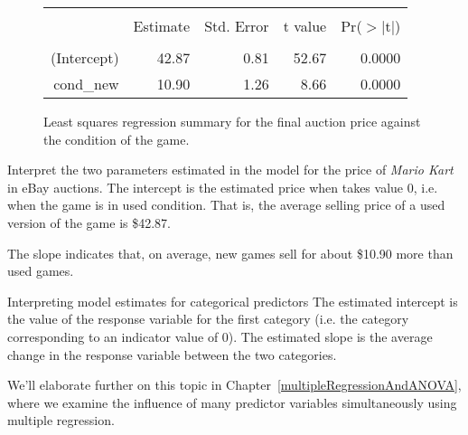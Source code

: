 \begin{figure}
\centering
\begin{tabular}{rrrrr}
  \hline
  \vspace{-3.7mm} & & & & \\
 & Estimate & Std. Error & t value & Pr($>$$|$t$|$) \\ 
  \hline
  \vspace{-3.6mm} & & & & \\
(Intercept) & 42.87 & 0.81 & 52.67 & 0.0000 \\ 
  cond\_\hspace{0.3mm}new & 10.90 & 1.26 & 8.66 & 0.0000 \\ 
   \hline
\end{tabular}
\caption{Least squares regression summary for the final auction price against the condition of the game.}
\label{marioKartNewUsedRegrSummary}
\end{figure}

\begin{examplewrap}
\begin{nexample}{Interpret the two parameters estimated in the model for the price of \emph{Mario Kart} in eBay auctions.}
The intercept is the estimated price when  takes value 0, i.e. when the game is in used condition. That is, the average selling price of a used version of the game is \$42.87.

The slope indicates that, on average, new games sell for about \$10.90 more than used games.
\end{nexample}
\end{examplewrap}

\begin{onebox}{Interpreting model estimates for categorical predictors}
The estimated intercept is the value of the response variable for the first category (i.e. the category corresponding to an indicator value of 0). The estimated slope is the average change in the response variable between the two categories.
\end{onebox}

We'll elaborate further on this topic in
Chapter~\ref{multipleRegressionAndANOVA},
where we examine the influence of many
predictor variables simultaneously using
multiple regression.




